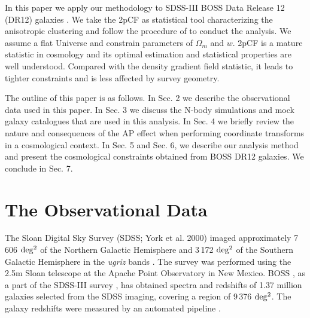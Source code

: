 \documentclass[iop]{emulateapj}
\begin{document}
In this paper we apply our methodology to SDSS-III BOSS Data Release 12 (DR12) galaxies \citep{Reidetal:2016}.
We take the 2pCF as statistical tool characterizing the anisotropic clustering and follow the procedure of \cite{Li2015} to conduct the analysis.
We assume a flat Universe and constrain parameters of $\Omega_m$ and $w$.
2pCF is a mature statistic in cosmology and its optimal estimation and statistical properties are well understood.
Compared with the density gradient field statistic, it leads to tighter constraints and is less affected by survey geometry.


The outline of this paper is as follows. 
In Sec. 2 we describe the observational data used in this paper.
In Sec. 3 we discuss the N-body simulations and mock galaxy catalogues that are used in this analysis.
In Sec. 4 we briefly review the nature and consequences of the AP effect when performing coordinate transforms in a cosmological context. 
In Sec. 5 and Sec. 6, we describe our analysis method and present the cosmological constraints obtained from BOSS DR12 galaxies. 
We conclude in Sec. 7.




\section{The Observational Data}\label{sec:data}

The Sloan Digital Sky Survey (SDSS; York et al. 2000) %
imaged approximately 7\,606 $\rm deg^2$
of the Northern Galactic Hemisphere and 
3\,172 $\rm deg^2$ of the Southern Galactic Hemisphere in the {\it ugriz} bands \citep{Fukugita1996,Gunn1998}.
The survey was performed using the 
2.5m Sloan telescope \citep{Gunn et al. 2006}
at the Apache Point Observatory in New Mexico.
BOSS \citep{Dawson et al. 2012,Smee2013}, as a part of the SDSS-III survey \citep{Eisenstein et al. 2011},
has obtained spectra and redshifts 
of 1.37 million galaxies selected from the SDSS imaging,
covering a region of 9\,376 $\rm deg^2$.
The galaxy redshifts were measured by an automated pipeline \citep{Bolton2012}.
\end{document}
